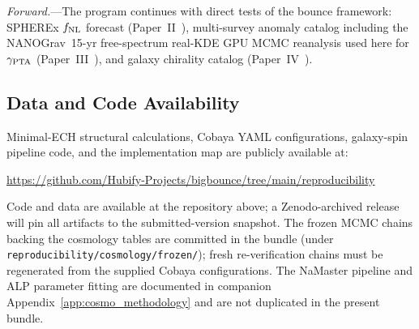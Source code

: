 \documentclass[aps,prd,twocolumn,superscriptaddress,showpacs,preprintnumbers,nofootinbib,longbibliography,floatfix]{revtex4-2}
\newcommand{\fnl}{f_{\rm NL}}
\begin{document}
\textit{Forward.}---The program continues with direct tests of the bounce framework:
SPHEREx $\fnl$ forecast (Paper~II~\cite{Golden2026P2}), multi-survey anomaly
catalog including the NANOGrav~15-yr free-spectrum real-KDE GPU MCMC
reanalysis used here for $\gamma_{\rm PTA}$
(Paper~III~\cite{Golden2026P3}), and galaxy chirality catalog
(Paper~IV~\cite{Golden2026P4}).

\subsection*{Data and Code Availability}

Minimal-ECH structural calculations, Cobaya YAML configurations, galaxy-spin
pipeline code, and the implementation map are publicly available at:
\begin{center}
\url{https://github.com/Hubify-Projects/bigbounce/tree/main/reproducibility}
\end{center}
Code and data are available at the repository above; a Zenodo-archived
release will pin all artifacts to the submitted-version snapshot.
The frozen MCMC chains backing the cosmology tables are committed in the
bundle (under \texttt{reproducibility/cosmology/frozen/}); fresh re-verification
chains must be regenerated from the supplied Cobaya configurations. The
NaMaster pipeline and ALP parameter fitting are documented in companion
Appendix~\ref{app:cosmo_methodology} and are not duplicated in the
present bundle.
\end{document}
